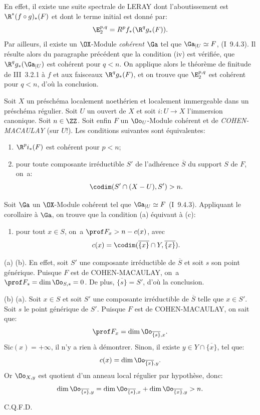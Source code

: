En effet, il existe une suite spectrale de LERAY dont l'aboutissement est $\R^\ast(f\circ g)_\ast(F)$ et dont le terme initial est donn\'e par:
\[
\E^{p, q}_2=R^pf_\ast(\R^qg_\ast(F)).
\]
Par ailleurs, il existe un $\OX$-Module \emph{coh\'erent} ${\Ga}$ tel que ${\Ga}{}_{|U}\simeq F$, (\EGA I~9.4.3). Il r\'esulte alors du paragraphe pr\'ec\'edent que la condition (iv) \ignorespaces est v\'erifi\'ee\pageoriginale, \ie que $\R^qg_\ast({\Ga}{}_{|U})$ est coh\'erent pour $q<n$. On applique alors le th\'eor\`eme de finitude de \EGA III~3.2.1 \`a $f$ et aux faisceaux $\R^qg_\ast(F)$, et on trouve que $\E^{p, q}_2$ est coh\'erent pour $q<n$, d'o\`u la conclusion.

\begin{proposition} \label{VIII.3.2} Soit $X$ un pr\'esch\'ema localement noeth\'erien et localement immergeable dans un pr\'esch\'ema r\'egulier. Soit $U$ un ouvert de $X$ et soit $i\colon U\to X$ l'immersion canonique. Soit $n\in\ZZ$. Soit enfin $F$ un $\Oo_U$-Module coh\'erent et de \emph{COHEN-MACAULAY} (sur $U$!). Les conditions suivantes sont \'equivalentes:
\begin{enumerate}
\item[(a)]
$\R^pi_\ast(F)$ est coh\'erent pour $p<n$;

\item[(b)]
pour toute composante irr\'eductible $S'$ de l'adh\'erence $\overline S$ du support $S$ de $F$, on~a:
\[
\codim (S'\cap (X-U), S')>n.
\]
\end{enumerate}
\end{proposition}

Soit ${\Ga}$ un $\OX$-Module coh\'erent tel que ${\Ga}{}_{|U}\simeq F$ (\EGA I~9.4.3). Appliquant le corollaire  \`a ${\Ga}$, on trouve que la condition (a) \'equivaut \`a (c):
\begin{enumerate}
\item[(c)]
pour tout $x\in S$, on~a $\prof F_x>n-c(x)$, avec
\[c(x)=\codim(\overline{\{x\}}\cap Y, \overline{\{x\}}).
\]
\end{enumerate}

(a) \ALORS (b). En effet, soit $S'$ une composante irr\'eductible de $\overline S$ et soit $s$ son point g\'en\'erique. Puisque $F$ est de COHEN-MACAULAY, on~a $\prof F_s=\dim \Oo_{S, s}=0$. De plus, $\overline{\{s\}}=S'$, d'o\`u la conclusion.

(b) \ALORS (a). Soit $x\in S$ et soit $S'$ une composante irr\'eductible de $\overline{S}$ telle que $x\in S'$. Soit $s$ le point g\'en\'erique de $S'$. Puisque $F$ est de COHEN-MACAULAY, on sait que:
\[
\prof F_x=\dim \Oo_{\overline{\{s\}}, x}.
\]
Si\pageoriginale $c(x)=+\infty$, il n'y a rien \`a d\'emontrer. Sinon, il existe $y\in Y\cap \overline{\{x\}}$, tel que:
\[c(x)=\dim \Oo_{\overline{\{x\}}, y}.
\]
Or $\Oo_{X, y}$ est quotient d'un anneau local r\'egulier par hypoth\`ese, donc:
\[
\dim \Oo_{\overline{\{s\}}, y}=\dim \Oo_{\overline{\{s\}}, x} +\dim \Oo_{\overline{\{x\}}, y}>n.
\]
\begin{flushright}C.Q.F.D.\end{flushright}

